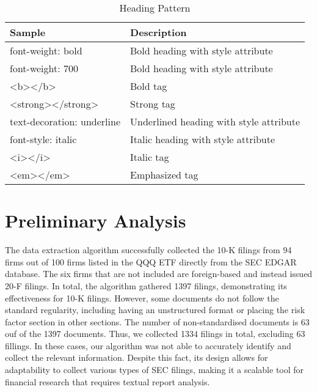 \documentclass[logo,bsc,singlespacing,parskip]{infthesis}
\begin{document}
\begin{table}[ht]
    \centering
    \begin{tabular}{|l|l|}
        \hline
        \textbf{Sample} & \textbf{Description} \\
        \hline
        {\scriptsize font-weight: bold} & {\scriptsize Bold heading with style attribute} \\
        \hline
        \scriptsize{font-weight: 700} & {\scriptsize Bold heading with style attribute}  \\
        \hline
        \scriptsize{\textless b\textgreater\textless/b\textgreater} & {\scriptsize Bold tag}  \\
        \hline
        \scriptsize{<strong></strong>} & {\scriptsize Strong tag}  \\
        \hline
        \scriptsize{text-decoration: underline} & {\scriptsize Underlined heading with style attribute}  \\
        \hline
        \scriptsize{font-style: italic} & {\scriptsize Italic heading with style attribute} \\
        \hline
        \scriptsize{\textless i\textgreater\textless /i\textgreater} & {\scriptsize Italic tag} \\
        \hline
        \scriptsize{\textless em\textgreater\textless/em\textgreater} & {\scriptsize Emphasized tag} \\
        \hline
        
    \end{tabular}
    \caption{Heading Pattern}
    \label{tab:pattern}
\end{table}




\section{Preliminary Analysis}
The data extraction algorithm successfully collected the 10-K filings from 94 firms out of 100 firms listed in the QQQ ETF directly from the SEC EDGAR database. The six firms that are not included are foreign-based and instead issued 20-F filings. In total, the algorithm gathered 1397 filings, demonstrating its effectiveness for 10-K filings. However, some documents do not follow the standard regularity, including having an unstructured format or placing the risk factor section in other sections. The number of non-standardised documents is 63 ouf of the 1397 documents.  Thus, we collected 1334 filings in total, excluding 63 fillings. In these cases, our algorithm was not able to accurately identify and collect the relevant information. Despite this fact, its design allows for adaptability to collect various types of SEC filings, making it a scalable tool for financial research that requires textual report analysis. 
\end{document}
